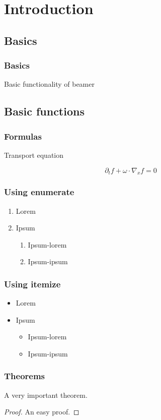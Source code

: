 \documentclass{beamer}
\begin{document}
\section{Introduction}
\subsection{Basics}
\begin{frame}
	\frametitle{Basics}
Basic functionality of beamer
	
\end{frame}


\subsection{Basic functions}

\begin{frame}
	\frametitle{Formulas}
	Transport equation

	\begin{center}
		 \[\partial_t f+\omega\cdot\nabla_x f =0\]
	\end{center}

\end{frame}

\begin{frame}
\frametitle{Using enumerate}
\begin{enumerate}
\item Lorem 
\item Ipsum
\begin{enumerate}
\item Ipsum-lorem
\item Ipsum-ipsum
\end{enumerate}
\end{enumerate}

\end{frame}

\begin{frame}
\frametitle{Using itemize}
\begin{itemize}
\item Lorem 
\item Ipsum
\begin{itemize}
\item Ipsum-lorem
\item Ipsum-ipsum
\end{itemize}
\end{itemize}
\end{frame}

\begin{frame}
\frametitle{Theorems}
\begin{theorem}
A very important theorem.
\end{theorem}
\begin{proof}
An easy proof.
\end{proof}
\end{frame}
\end{document}
